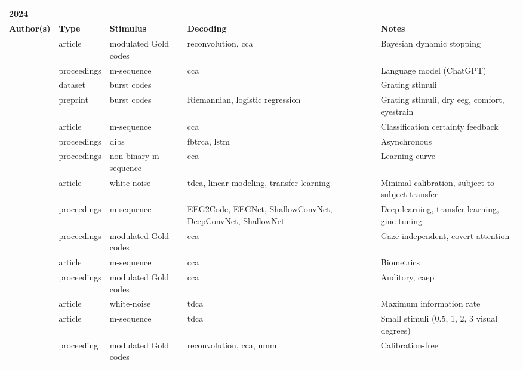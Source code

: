 \documentclass[a4paper,landscape]{article}
\begin{document}
	
\begin{table}[H]
	\begin{tabular}{p{5cm}p{2cm}p{5cm}p{5cm}p{6.5cm}}
		\textbf{2024} & & & & \\ 
		\toprule
		\textbf{Author(s)} & \textbf{Type} & \textbf{Stimulus} & \textbf{Decoding} & \textbf{Notes} \\ 
		\midrule
		\citeauthor{ahmadi2024} & article & modulated Gold codes & reconvolution, \acrshort{cca} & Bayesian dynamic stopping \\
		\citeauthor{canturk2024} & proceedings & m-sequence & \acrshort{cca} & Language model (ChatGPT) \\
		\citeauthor{castillos2024dataset} & dataset & burst codes & & Grating stimuli \\
		\citeauthor{dehais2024} & preprint & burst codes & Riemannian, logistic regression & Grating stimuli, dry \acrshort{eeg}, comfort, eyestrain \\
		\citeauthor{fodor2024} & article & m-sequence & \acrshort{cca} & Classification certainty feedback \\
		\citeauthor{lai2024} & proceedings & \acrshort{dibs} & \acrfull{fbtrca}, \acrshort{lstm} & Asynchronous \\
		\citeauthor{martinez2024} & proceedings & non-binary m-sequence & \acrshort{cca} & Learning curve \\
		\citeauthor{miao2024a} & article & white noise & \acrshort{tdca}, linear modeling, transfer learning & Minimal calibration, subject-to-subject transfer \\
		\citeauthor{miao2024b} & proceedings & m-sequence & EEG2Code, EEGNet, ShallowConvNet, DeepConvNet, ShallowNet & Deep learning, transfer-learning, gine-tuning \\
		\citeauthor{narayanan2024} & proceedings & modulated Gold codes & \acrshort{cca} & Gaze-independent, covert attention \\
		\citeauthor{qu2024} & article & m-sequence & \acrshort{cca} & Biometrics \\
		\citeauthor{scheppink2024} & proceedings & modulated Gold codes & \acrshort{cca} & Auditory, \acrshort{caep} \\
		\citeauthor{shi2024} & article & white-noise & \acrshort{tdca} & Maximum information rate \\
		\citeauthor{sun2024} & article & m-sequence & \acrshort{tdca} & Small stimuli (0.5, 1, 2, 3 visual degrees) \\
		\citeauthor{thielen2024} & proceeding & modulated Gold codes & reconvolution, \acrshort{cca}, \acrshort{umm} & Calibration-free \\

\end{tabular}
\end{table}
\end{document}
